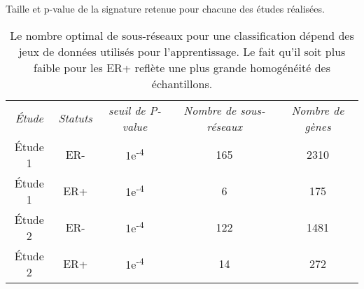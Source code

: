 				\begin{table}

				\begin{center}
					\caption{Taille et p-value de la signature retenue pour chacune des études réalisées.}
					\begin{tabular}{ccccc}
						\toprule
						\multirow{2}{2cm}{\centering\emph{Étude}} & \multirow{2}{1.5cm}{\centering\emph{Statuts}} & \multirow{2}{1.5cm}{\centering\emph{seuil de P-value}} & \multirow{2}{2cm}{\centering\emph{Nombre de sous-réseaux}} & \multirow{2}{1.5cm}{\centering\emph{Nombre de gènes}} \\
						&&&&\\
						\midrule
						Étude 1      & ER-            & 1e\textsuperscript{-4}  & 165                           & 2310                    \\
						Étude 1      & ER+            & 1e\textsuperscript{-4}  & 6                             & 175                     \\
						Étude 2      & ER-            & 1e\textsuperscript{-4}  & 122                           & 1481                    \\
						Étude 2      & ER+            & 1e\textsuperscript{-4}  & 14                            & 272                     \\
						\bottomrule
					\end{tabular}
					\label{tab:Res2pvalue}
					\vspace{5ex}
					\caption*{Le nombre optimal de sous-réseaux pour une classification dépend des jeux de données utilisés pour l'apprentissage. Le fait qu'il soit plus faible pour les ER+ reflète une plus grande homogénéité des échantillons.}
				\end{center}
			\end{table}

